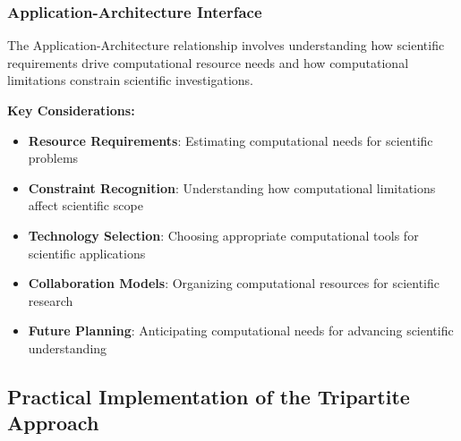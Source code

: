 \subsubsection{Application-Architecture Interface}

The Application-Architecture relationship involves understanding how scientific requirements drive computational resource needs and how computational limitations constrain scientific investigations.

\textbf{Key Considerations:}
\begin{itemize}
    \item \textbf{Resource Requirements}: Estimating computational needs for scientific problems
    \item \textbf{Constraint Recognition}: Understanding how computational limitations affect scientific scope
    \item \textbf{Technology Selection}: Choosing appropriate computational tools for scientific applications
    \item \textbf{Collaboration Models}: Organizing computational resources for scientific research
    \item \textbf{Future Planning}: Anticipating computational needs for advancing scientific understanding
\end{itemize}

\subsection{Practical Implementation of the Tripartite Approach}

